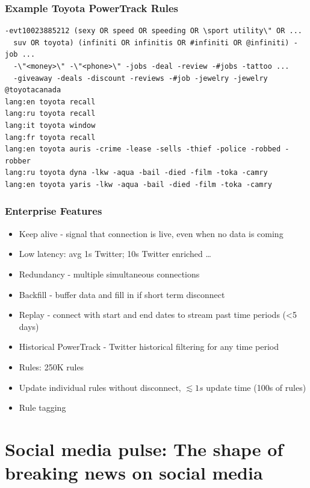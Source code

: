 \documentclass{beamer}
\begin{document}

\begin{frame}[fragile]\frametitle{Example Toyota PowerTrack Rules}
\begin{verbatim}
-evt10023885212 (sexy OR speed OR speeding OR \sport utility\" OR ...
  suv OR toyota) (infiniti OR infinitis OR #infiniti OR @infiniti) -job ...
  -\"<money>\" -\"<phone>\" -jobs -deal -review -#jobs -tattoo ...
  -giveaway -deals -discount -reviews -#job -jewelry -jewelry
@toyotacanada
lang:en toyota recall
lang:ru toyota recall
lang:it toyota window
lang:fr toyota recall
lang:en toyota auris -crime -lease -sells -thief -police -robbed -robber
lang:ru toyota dyna -lkw -aqua -bail -died -film -toka -camry
lang:en toyota yaris -lkw -aqua -bail -died -film -toka -camry
\end{verbatim}
\end{frame}

\begin{frame}\frametitle{Enterprise Features}
\begin{center}
\begin{itemize}
\item Keep alive - signal that connection is live, even when no data is coming
\item Low latency: avg 1s Twitter; 10s Twitter enriched \ldots
\item Redundancy - multiple simultaneous connections
\item Backfill - buffer data and fill in if short term disconnect
\item Replay - connect with start and end dates to stream past time periods (<5 days)
\item Historical PowerTrack - Twitter historical filtering for any time period
\item Rules: 250K rules
\item Update individual rules without disconnect, $\lesssim1s$ update time (100s of rules)
\item Rule tagging
\end{itemize}
\end{center}
\end{frame}

%
%

\section{Social media pulse: The shape of breaking news on social media}
\begin{frame}
\begin{center}
{\Huge \insertsection }
\end{center}
\end{frame}
\end{document}
